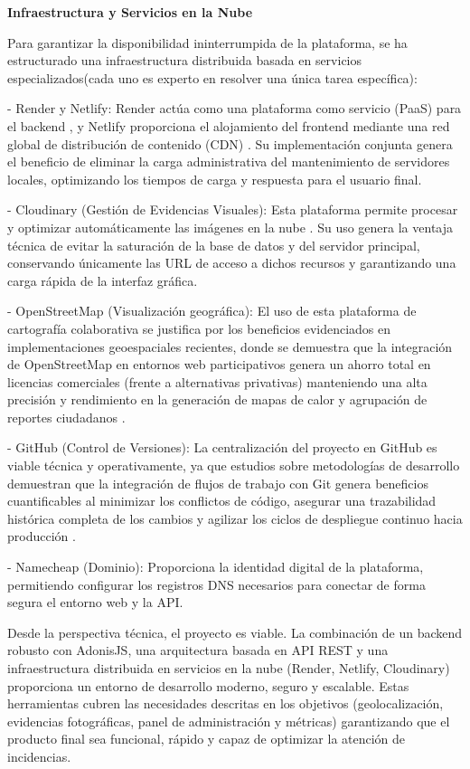  \textbf{Infraestructura y Servicios en la Nube}
 
 Para garantizar la disponibilidad ininterrumpida de la plataforma, se ha estructurado una infraestructura distribuida basada en servicios especializados(cada uno es experto en resolver una única tarea específica):
 
 - Render y Netlify: Render actúa como una plataforma como servicio (PaaS) para el backend \parencite{render2024}, y Netlify proporciona el alojamiento del frontend mediante una red global de distribución de contenido (CDN) \parencite{netlify2024}. Su implementación conjunta genera el beneficio de eliminar la carga administrativa del mantenimiento de servidores locales, optimizando los tiempos de carga y respuesta para el usuario final.
 
 - Cloudinary (Gestión de Evidencias Visuales): Esta plataforma permite procesar y optimizar automáticamente las imágenes en la nube \parencite{cloudinary2024}. Su uso genera la ventaja técnica de evitar la saturación de la base de datos y del servidor principal, conservando únicamente las URL de acceso a dichos recursos y garantizando una carga rápida de la interfaz gráfica.
 
 - OpenStreetMap (Visualización geográfica): El uso de esta plataforma de cartografía colaborativa se justifica por los beneficios evidenciados en implementaciones geoespaciales recientes, donde se demuestra que la integración de OpenStreetMap en entornos web participativos genera un ahorro total en licencias comerciales (frente a alternativas privativas) manteniendo una alta precisión y rendimiento en la generación de mapas de calor y agrupación de reportes ciudadanos \parencite{fernandez2023osm}.
 
 - GitHub (Control de Versiones): La centralización del proyecto en GitHub es viable técnica y operativamente, ya que estudios sobre metodologías de desarrollo demuestran que la integración de flujos de trabajo con Git genera beneficios cuantificables al minimizar los conflictos de código, asegurar una trazabilidad histórica completa de los cambios y agilizar los ciclos de despliegue continuo hacia producción \parencite{rodriguez2022git}.
 
 - Namecheap (Dominio): Proporciona la identidad digital de la plataforma, permitiendo configurar los registros DNS necesarios para conectar de forma segura el entorno web y la API.
	
	Desde la perspectiva técnica, el proyecto es viable. La combinación de un backend robusto con AdonisJS, una arquitectura basada en API REST y una infraestructura distribuida en servicios en la nube (Render, Netlify, Cloudinary) proporciona un entorno de desarrollo moderno, seguro y escalable. Estas herramientas cubren las necesidades descritas en los objetivos (geolocalización, evidencias fotográficas, panel de administración y métricas) garantizando que el producto final sea funcional, rápido y capaz de optimizar la atención de incidencias.
	
